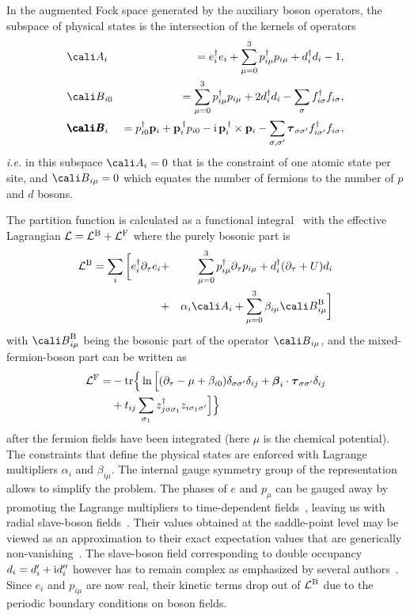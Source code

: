 \documentclass[showpacs,amsmath,twocolumn,floatfix]{revtex4-1}
\newcommand\ii{\mathrm{i \,}}
\begin{document}
In the augmented Fock space generated by the auxiliary boson operators, 
the subspace of physical states is the intersection of the kernels of 
operators 
\begin{eqnarray}\label{eq:const}
 & {\cali A}_i &= e_i^{\dagger} e_i + \sum_{\mu=0}^3 p_{i\mu}^{\dagger} p_{i\mu} 
 +  d_i^{\dagger} d_i - 1,  \nonumber\\
 & {\cali B}_{i0} & = \sum_{\mu=0}^3 p_{i\mu}^{\dagger} p_{i\mu} + 2 d_i^{\dagger} d_i 
 - \sum_{\sigma} f_{i \sigma}^{\dagger} f_{i \sigma}, \\
 & \pmb{\cali B}_i & =  p_{i0}^{\dagger} {\bf p}_i + {\bf p}_i^{\,\dagger} p_{i0} 
 - \ii {\bf p}_i^{\,\dagger} \times {\bf p}_i  - \sum_{\sigma, \sigma'} 
 \boldsymbol{ \tau}_{\sigma \sigma'} f_{i\sigma'}^{\dagger} f_{i\sigma}, \nonumber
\end{eqnarray}
{\it i.e.} in this subspace ${\cali A}_i = 0$ that is the constraint of one 
atomic state per site, and ${\cali B}_{i\mu} = 0$ which equates the 
number of fermions to the number of $p$ and $d$ bosons.


The partition function is calculated as a functional integral~\cite{li91,Zim97} 
with the effective Lagrangian 
${\cal L} = {\cal L}^{\rm B} + {\cal L}^{\rm F}$ where the purely 
bosonic part is
\begin{eqnarray}
 {\cal L}^{\rm B} = \sum_i  \bigg[  e_i^{\dagger} \partial_{\tau} e_i
 & + & \sum_{\mu=0}^3 p_{i\mu}^{\dagger} \partial_{\tau} p_{i\mu}  
 + d_i^{\dagger} (\partial_{\tau} + U) d_i  \nonumber \\
 & + & \alpha_i {\cali A}_i + \sum_{\mu=0}^3 \beta_{i\mu}  {\cali B}_{i\mu}^{\rm B} \bigg]
\end{eqnarray}
with ${\cali B}_{i\mu}^{\rm B}$ being the bosonic part of the operator 
${\cali B}_{i\mu}$, and the mixed-fermion-boson part can be written as
\begin{eqnarray}
{\cal L}^{\rm F} = & - {\rm tr} \Big\{ \ln \Big[ (\partial_{\tau} - \mu +  \beta_{i0}) 
\delta_{\sigma\sigma'} \delta_{ij} + \boldsymbol{\beta}_i \cdot 
\boldsymbol{\tau}_{\sigma\sigma'} \delta_{ij} \nonumber \\
 & + t_{ij} \sum_{\sigma_1} z_{j\sigma\sigma_1}^{\dagger} z_{i\sigma_1\sigma'} \Big] \Big\}
\end{eqnarray}
after the fermion fields have been integrated (here $\mu$ is the chemical 
potential). The constraints that define the physical states are enforced 
with Lagrange multipliers $\alpha_i$ and $\beta_{i\mu}$. The internal gauge 
symmetry group of the representation allows to simplify the problem. The 
phases of $e$ and $p_{\mu}$ can be gauged away by promoting the Lagrange 
multipliers to time-dependent fields~\cite{FW}, leaving us with radial 
slave-boson fields~\cite{Fre01}. Their values obtained at the saddle-point level 
may be viewed as an approximation to their exact expectation values that are 
generically non-vanishing~\cite{Kop07}. The slave-boson field 
corresponding to double occupancy $d_i = d'_i + {\rm i} d''_i$ however 
has to remain complex as emphasized by several authors~\cite{Jol91,Kot92,FW}. 
Since $e_i$ and $p_{i\mu}$ are now real, their kinetic terms drop out of 
${\cal L}^{\rm B}$ due to the periodic boundary conditions on boson fields. 
\end{document}
